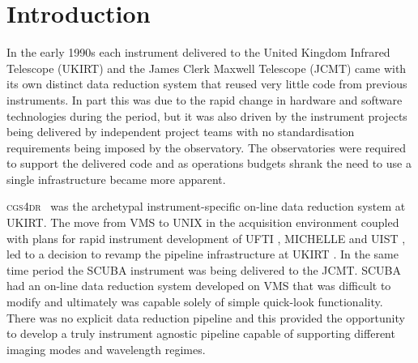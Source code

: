 \documentclass[final,authoryear,5p,times,twocolumn]{elsarticle}
\begin{document}

\newcommand{\mnras}{MNRAS}
\newcommand{\aap}{A\&A}
\newcommand{\aaps}{A\&AS}
\newcommand{\pasp}{PASP}
\newcommand{\apj}{ApJ}
\newcommand{\apjs}{ApJS}
\newcommand{\qjras}{QJRAS}
\newcommand{\an}{Astron.\ Nach.}
\newcommand{\ijimw}{Int.\ J.\ Infrared \& Millimeter Waves}
\newcommand{\procspie}{Proc.\ SPIE}
\newcommand{\aspconf}{ASP Conf. Ser.}


\newcommand{\recipe}{\emph{Recipe}}
\newcommand{\recipes}{\emph{Recipes}}
\newcommand{\primitive}{\emph{Primitive}}
\newcommand{\primitives}{\emph{Primitives}}
\newcommand{\Frame}{\emph{Frame}}
\newcommand{\Group}{\emph{Group}}
\newcommand{\Index}{\emph{index}}

\newcommand{\oracdr}{\textsc{orac-dr}}
\newcommand{\cgsdr}{\textsc{cgs}{\footnotesize 4}\textsc{dr}}

\newcommand{\ascl}[1]{\href{http://www.ascl.net/#1}{ascl:#1}}


\section{Introduction}

In the early 1990s each instrument delivered to the United Kingdom
Infrared Telescope (UKIRT) and the James Clerk Maxwell Telescope (JCMT) came
with its own distinct data reduction system that reused very little
code from previous instruments. In part this was due to the rapid
change in hardware and software technologies during the period, but it
was also driven by the instrument projects being delivered
by independent project teams with no standardisation requirements
being imposed by the observatory. The observatories were required to
support the delivered code and as operations budgets shrank the need
to use a single infrastructure became more apparent.

\cgsdr\
\citep[][\ascl{1406.013}]{1992ASPC...25..479S,1996ASPC...87..223D} was
the archetypal instrument-specific on-line data reduction system at
UKIRT. The move from VMS to UNIX in the acquisition environment coupled
with plans for rapid instrument development of UFTI
\citep{2003SPIE.4841..901R}, MICHELLE \citep{1993ASPC...41..401G} and
UIST \citep{2004SPIE.5492.1160R}, led to a decision to revamp the
pipeline infrastructure at UKIRT \citep{1998ASPC..145..196E}. In the
same time period the SCUBA instrument \citep{1999MNRAS.303..659H} was
being delivered to the JCMT. SCUBA had an on-line data reduction
system developed on VMS that was difficult to modify and ultimately
was capable solely of simple quick-look functionality. There was no explicit
data reduction pipeline and this provided the opportunity to develop a
truly instrument agnostic pipeline capable of supporting different
imaging modes and wavelength regimes.
\end{document}
